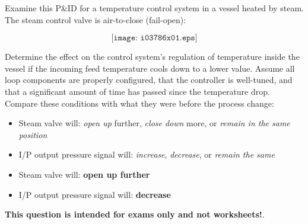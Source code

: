 

Examine this P\&ID for a temperature control system in a vessel heated by steam.  The steam control valve is air-to-close (fail-open):

$$\texttt{[image: i03786x01.eps]}$$

Determine the effect on the control system's regulation of temperature inside the vessel if the incoming feed temperature cools down to a lower value.  Assume all loop components are properly configured, that the controller is well-tuned, and that a significant amount of time has passed since the temperature drop.  Compare these conditions with what they were before the process change:

\begin{itemize}
\item{} Steam valve will: {\it open up} further, {\it close down} more, or {\it remain in the same position} 
\vskip 10pt
\item{} I/P output pressure signal will: {\it increase}, {\it decrease}, or {\it remain the same} 
\end{itemize}







\begin{itemize}
\item{} Steam valve will: {\bf open up further}
\vskip 5pt
\item{} I/P output pressure signal will: {\bf decrease}
\end{itemize}







{\bf This question is intended for exams only and not worksheets!}.



